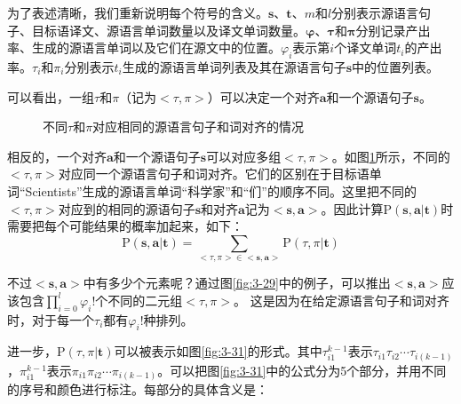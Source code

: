 \parinterval 为了表述清晰，我们重新说明每个符号的含义。$\mathbf{s}$、$\mathbf{t}$、$m$和$l$分别表示源语言句子、目标语译文、源语言单词数量以及译文单词数量。$\mathbf{\varphi}$、$\mathbf{\tau}$和$\mathbf{\pi}$分别记录产出率、生成的源语言单词以及它们在源文中的位置。${\varphi}_{i}$表示第$i$个译文单词$t_i$的产出率。${\tau}_{i}$和${\pi}_i$分别表示$t_i$生成的源语言单词列表及其在源语言句子$\mathbf{s}$中的位置列表。

\parinterval 可以看出，一组$\tau$和$\pi$（记为$<\tau,\pi>$）可以决定一个对齐$\mathbf{a}$和一个源语句子$\mathbf{s}$。
\vspace{0.5em}
\begin{figure}[htp]
    \centering

   \caption{不同$\tau$和$\pi$对应相同的源语言句子和词对齐的情况}
   \label{fig:3-30}
\end{figure}

\vspace{-0.2em}
\noindent 相反的，一个对齐$\mathbf{a}$和一个源语句子$\mathbf{s}$可以对应多组$<\tau,\pi>$。如图\ref{fig:3-30}所示，不同的$<\tau,\pi>$对应同一个源语言句子和词对齐。它们的区别在于目标语单词``Scientists''生成的源语言单词``科学家''和``们''的顺序不同。这里把不同的$<\tau,\pi>$对应到的相同的源语句子$\mathbf{s}$和对齐$\mathbf{a}$记为$<\mathbf{s},\mathbf{a}>$。因此计算$\textrm{P}(\mathbf{s},\mathbf{a}| \mathbf{t})$时需要把每个可能结果的概率加起来，如下：
\begin{equation}
\textrm{P}(\mathbf{s},\mathbf{a}| \mathbf{t})=\sum_{{<\tau,\pi>}\in{<\mathbf{s},\mathbf{a}>}}{\textrm{P}(\tau,\pi|\mathbf{t}) }
\label{eq:3-66}
\end{equation}

\parinterval 不过$<\mathbf{s},\mathbf{a}>$中有多少个元素呢？通过图\ref{fig:3-29}中的例子，可以推出$<\mathbf{s},\mathbf{a}>$应该包含$\prod_{i=0}^{l}{\varphi_i !}$个不同的二元组$<\tau,\pi>$。 这是因为在给定源语言句子和词对齐时，对于每一个$\tau_i$都有$\varphi_{i}!$种排列。

\parinterval 进一步，$\textrm{P}(\tau,\pi|\mathbf{t})$可以被表示如图\ref{fig:3-31}的形式。其中$\tau_{i1}^{k-1}$表示$\tau_{i1}\tau_{i2}\cdots \tau_{i(k-1)}$，$\pi_{i1}^{ k-1}$表示$\pi_{i1}\pi_{i2}\cdots \pi_{i(k-1)}$。可以把图\ref{fig:3-31}中的公式分为5个部分，并用不同的序号和颜色进行标注。每部分的具体含义是：

